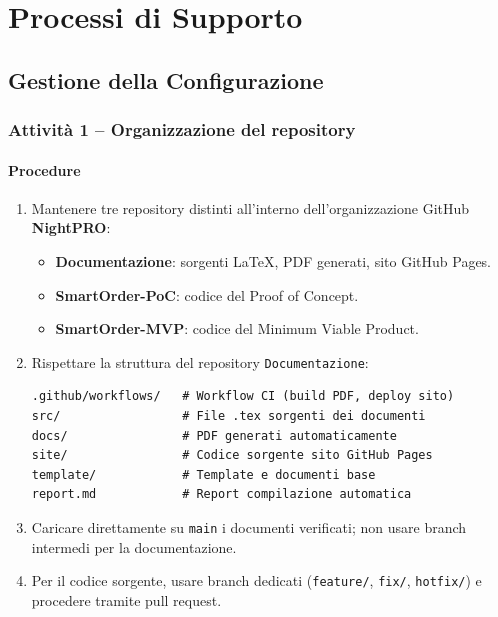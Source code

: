 \documentclass[a4paper, 11pt, oneside]{scrartcl}
\begin{document}
\newpage
\section{Processi di Supporto}

\subsection{Gestione della Configurazione}

\subsubsection{Attività 1 – Organizzazione del repository}

\paragraph{Procedure}
\begin{enumerate}
    \item Mantenere tre repository distinti all'interno dell'organizzazione GitHub \textbf{NightPRO}:
          \begin{itemize}
              \item \textbf{Documentazione}: sorgenti \LaTeX{}, PDF generati, sito GitHub Pages.
              \item \textbf{SmartOrder-PoC}: codice del Proof of Concept.
              \item \textbf{SmartOrder-MVP}: codice del Minimum Viable Product.
          \end{itemize}
    \item Rispettare la struttura del repository \texttt{Documentazione}:
          \begin{verbatim}
.github/workflows/   # Workflow CI (build PDF, deploy sito)
src/                 # File .tex sorgenti dei documenti
docs/                # PDF generati automaticamente
site/                # Codice sorgente sito GitHub Pages
template/            # Template e documenti base
report.md            # Report compilazione automatica
\end{verbatim}
    \item Caricare direttamente su \texttt{main} i documenti verificati; non usare branch intermedi per la documentazione.
    \item Per il codice sorgente, usare branch dedicati (\texttt{feature/}, \texttt{fix/}, \texttt{hotfix/}) e procedere tramite pull request.
\end{enumerate}
\end{document}
